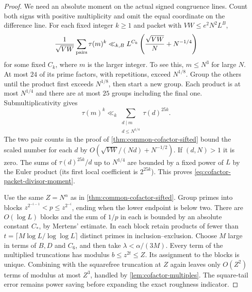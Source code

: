 \documentclass[11pt,a4paper]{article}
\numberwithin{equation}{section}
\begin{document}
\begin{proof}
We need an absolute moment on the actual signed congruence lines.
Count both signs with positive multiplicity and omit the equal
coordinate on the difference line. For each fixed integer $k\ge1$
and packet with $VW\le e^2N^2L^B$,
\begin{equation}
 \frac{1}{\sqrt{VW}}\sum_{\rm pairs}\tau(m)^k
 \ll_{k,B} L^{C_k}\left(\frac{\sqrt{VW}}{N}+N^{-1/4}\right)
 \label{eq:cofactor-packet-divisor-moment}
\end{equation}
for some fixed $C_k$, where $m$ is the larger integer. To see
this, $m\le N^3$ for large $N$. At most $24$ of its prime
factors, with repetitions, exceed $N^{1/8}$. Group the others
until the product first exceeds $N^{1/8}$, then start a new
group. Each product is at most $N^{1/4}$ and there are at most
$25$ groups including the final one. Submultiplicativity gives
\[
 \tau(m)^k\ll_k
       \sum_{\substack{d\mid m\\d\le N^{1/4}}}\tau(d)^{25k}.
\]
The two pair counts in the proof of \cref{thm:common-cofactor-sifted}
bound the scaled number for each $d$ by
$O(\sqrt{VW}/(Nd)+N^{-1/2})$. If $(d,N)>1$ it is zero.
The sums of $\tau(d)^{25k}/d$ up to $N^{1/4}$ are bounded by a
fixed power of $L$ by the Euler product (its first local
coefficient is $2^{25k}$). This proves
\eqref{eq:cofactor-packet-divisor-moment}.

Use the same $Z=N^\alpha$ as in \cref{thm:common-cofactor-sifted}.
Group primes into blocks $z^{2^{-i-1}}<p\le z^{2^{-i}}$,
ending when the lower endpoint is below two. There are $O(\log L)$
blocks and the sum of $1/p$ in each is bounded by an absolute
constant $C_*$, by Mertens' estimate. In each block retain
products of fewer than $t=\lceil M\log L/\log\log L\rceil$
distinct primes in inclusion--exclusion. Choose $M$ large in
terms of $B,D$ and $C_6$, and then take $\lambda<\alpha/(3M)$.
Every term of the multiplied truncations has modulus
$b\le z^{2t}\le Z$. Its assignment to the blocks is unique.
Combining with the squarefree truncation at $Z$ again leaves only
$O(Z^2)$ terms of modulus at most $Z^3$, handled by
\cref{lem:cofactor-multiples}. The square-tail error remains
power saving before expanding the exact roughness indicator.


\end{proof}
\end{document}
